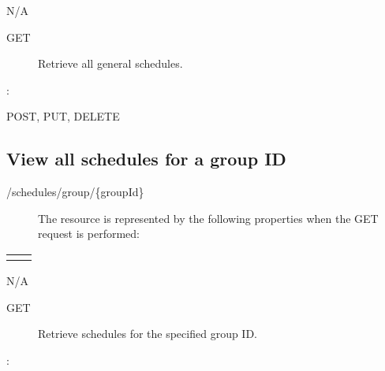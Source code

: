 \documentclass[letterpaper,10pt,english]{sphinxmanual}
\begin{document}
 N/A
\begin{description}
\item[{ GET}] \leavevmode
Retrieve all general schedules.

\end{description}

:

\begin{sphinxVerbatim}[commandchars=\\\{\}]
\end{sphinxVerbatim}

 POST, PUT, DELETE


\subsection{View all schedules for a group ID}
\label{\detokenize{restapi:view-all-schedules-for-a-group-id}}
 /schedules/group/\{groupId\}
\begin{description}
\item[{}] \leavevmode
The resource is represented by the following properties when the GET request is performed:

\end{description}


\begin{savenotes}\sphinxattablestart
\centering
\begin{tabulary}{\linewidth}[t]{|T|T|}
\hline

&
\\
\hline&\\
\hline
\end{tabulary}
\par
\sphinxattableend\end{savenotes}

 N/A
\begin{description}
\item[{ GET}] \leavevmode
Retrieve schedules for the specified group ID.

\end{description}

:

\begin{sphinxVerbatim}[commandchars=\\\{\}]
\end{sphinxVerbatim}
\end{document}
